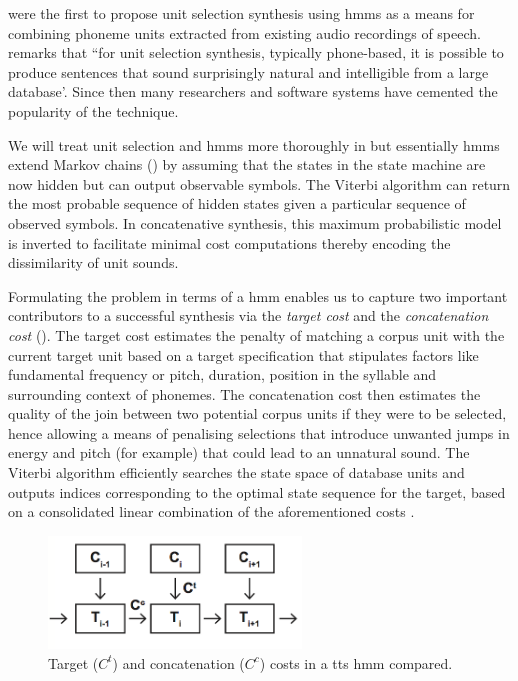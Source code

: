 \cite{Hunt1996} were the first to propose unit selection synthesis using \acrfull{hmm}s as a means for combining phoneme units extracted from existing audio recordings of speech. \cite{Conkie1999} remarks that ``for unit selection synthesis, typically phone-based, it is possible to produce sentences that sound surprisingly natural and intelligible from a large database'. Since then many researchers \citep{Conkie1999, balestri1999choose, schroder2001emotional, Tihelka2010, Lakkavalli2010} and software systems \citep{black1994chatr, beutnagel1999t, Young2002} have cemented the popularity of the technique.

We will treat unit selection and \acrshort{hmm}s more thoroughly in  but essentially \acrshort{hmm}s extend Markov chains () by assuming that the states in the state machine are now hidden but can output observable symbols. The Viterbi algorithm can return the most probable sequence of hidden states given a particular sequence of observed symbols. In concatenative synthesis, this maximum probabilistic model is inverted to facilitate minimal cost computations thereby encoding the dissimilarity of unit sounds.

Formulating the problem in terms of a \acrshort{hmm} enables us to capture two important contributors to a successful synthesis via the \textit{target cost} and the \textit{concatenation cost} (). The target cost estimates the penalty of matching a corpus unit with the current target unit based on a target specification that stipulates factors like fundamental frequency or pitch, duration, position in the syllable and surrounding context of phonemes. The concatenation cost then estimates the quality of the join between two potential corpus units if they were to be selected, hence allowing a means of penalising selections that introduce unwanted jumps in energy and pitch (for example) that could lead to an unnatural sound. The Viterbi algorithm efficiently searches the state space of database units and outputs indices corresponding to the optimal state sequence for the target, based on a consolidated linear combination of the aforementioned costs \citep{Ob1995, Hunt1996}.

\begin{figure}
	\begin{center}
		\includegraphics[width=0.6\textwidth]{ch04_sota/figures/costs.png}
	\end{center}
	\caption[Target and Concatenation Costs in a Text-To-Speech HMM Compared]{Target ($C^{t}$) and concatenation ($C^{c}$) costs in a \acrshort{tts} \acrshort{hmm} compared.}
	\label{fig:target_concat_costs}
\end{figure}


